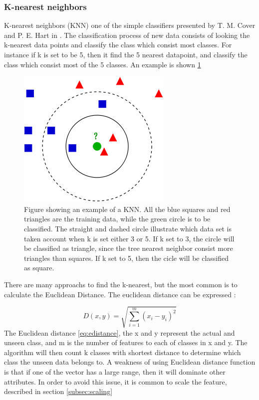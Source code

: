 \documentclass[USenglish]{ifimaster}  %
\begin{document}
\subsubsection{K-nearest neighbors }
K-nearest neighbors (KNN) one of the simple classifiers presented by  T. M. Cover and P. E. Hart in \cite{1053964}. The classification process of new data consists of looking the k-nearest data points and classify the class which consist most classes. For instance if k is set to be 5, then it find the 5 nearest datapoint, and classify the class which consist most of the 5 classes.  An example is shown \ref{fig:KNN}

\begin{figure}[h]
	\centering
	\includegraphics[scale=0.5]{Figures/KNN.png}
	\caption{Figure showing an example of a KNN\cite{KnnClassification}. All the blue squares and red triangles are the training data, while the green circle is to be classified. The straight and dashed circle illustrate which data set is taken account when k is set either 3 or 5. If k set to  3, the circle will be classified as triangle, since the tree nearest neighbor consist more triangles than squares. If k set to 5, then the cicle will be classified as square.}
	\label{fig:KNN}
\end{figure}

There are many approachs to find the k-nearest, but the most common is to calculate the Euclidean Distance. The euclidean distance can be expressed \cite{Bao2004}:


\begin{equation}
D(x,y)=\sqrt{\sum_{i=1}^{m}(x_{i}-y_{i})^2}
\label{eq:edistance}
\end{equation}
The Euclidean distance \ref{eq:edistance}, the x and y represent the actual and unseen class, and m is the number of features to each of classes in x and y. The algorithm will then count k classes with shortest distance to determine which class the unseen data belongs to. A weakness of using Euclidean distance function is that if one of the vector has a large range, then it will dominate other attributes. In order to avoid this issue, it is common to scale the feature, described in section \ref{subsec:scaling}
\end{document}
